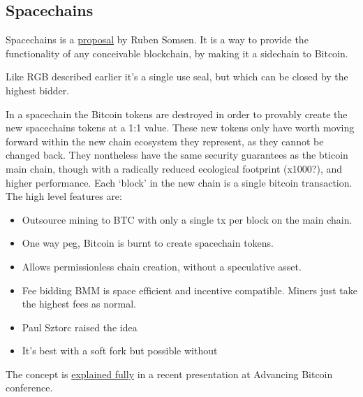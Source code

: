 \subsection{Spacechains}
Spacechains is a \href{https://medium.com/@RubenSomsen/21-million-bitcoins-to-rule-all-sidechains-the-perpetual-one-way-peg-96cb2f8ac302}{proposal} by Ruben Somsen. It is a way to provide the functionality of any conceivable blockchain, by making it a sidechain to Bitcoin. \par
Like RGB described earlier it's a single use seal, but which can be closed by the highest bidder.\par
In a spacechain the Bitcoin tokens are destroyed in order to provably create the new spacechains tokens at a 1:1 value. These new tokens only have worth moving forward within the new chain ecosystem they represent, as they cannot be changed back. They nontheless have the same security guarantees as the bticoin main chain, though with a radically reduced ecological footprint (x1000?), and higher performance. Each `block' in the new chain is a single bitcoin transaction. The high level features are:\par
\begin{itemize}
\item Outsource mining to BTC with only a single tx per block on the main chain.
\item One way peg, Bitcoin is burnt to create spacechain tokens.
\item Allows permissionless chain creation, without a speculative asset.
\item Fee bidding BMM is space efficient and incentive compatible. Miners just take the highest fees as normal.
\item Paul Sztorc raised the idea
\item It's best with a soft fork but possible without
\end{itemize}
The concept is \href{https://vimeo.com/703246895/d89aba6e56}{explained fully} in a recent presentation at Advancing Bitcoin conference.

